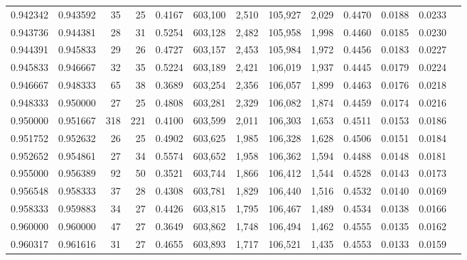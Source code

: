 \begin{tabular}{rrrrrrrrrrrrr}
0.942342 & 0.943592 &     35 &    25 &                                     0.4167 & 603,100 &   2,510 & 105,927 &   2,029 & 0.4470 & 0.0188 & 0.0233 \\
0.943736 & 0.944381 &     28 &    31 &                                     0.5254 & 603,128 &   2,482 & 105,958 &   1,998 & 0.4460 & 0.0185 & 0.0230 \\
0.944391 & 0.945833 &     29 &    26 &                                     0.4727 & 603,157 &   2,453 & 105,984 &   1,972 & 0.4456 & 0.0183 & 0.0227 \\
0.945833 & 0.946667 &     32 &    35 &                                     0.5224 & 603,189 &   2,421 & 106,019 &   1,937 & 0.4445 & 0.0179 & 0.0224 \\
0.946667 & 0.948333 &     65 &    38 &                                     0.3689 & 603,254 &   2,356 & 106,057 &   1,899 & 0.4463 & 0.0176 & 0.0218 \\
0.948333 & 0.950000 &     27 &    25 &                                     0.4808 & 603,281 &   2,329 & 106,082 &   1,874 & 0.4459 & 0.0174 & 0.0216 \\
0.950000 & 0.951667 &    318 &   221 &                                     0.4100 & 603,599 &   2,011 & 106,303 &   1,653 & 0.4511 & 0.0153 & 0.0186 \\
0.951752 & 0.952632 &     26 &    25 &                                     0.4902 & 603,625 &   1,985 & 106,328 &   1,628 & 0.4506 & 0.0151 & 0.0184 \\
0.952652 & 0.954861 &     27 &    34 &                                     0.5574 & 603,652 &   1,958 & 106,362 &   1,594 & 0.4488 & 0.0148 & 0.0181 \\
0.955000 & 0.956389 &     92 &    50 &                                     0.3521 & 603,744 &   1,866 & 106,412 &   1,544 & 0.4528 & 0.0143 & 0.0173 \\
0.956548 & 0.958333 &     37 &    28 &                                     0.4308 & 603,781 &   1,829 & 106,440 &   1,516 & 0.4532 & 0.0140 & 0.0169 \\
0.958333 & 0.959883 &     34 &    27 &                                     0.4426 & 603,815 &   1,795 & 106,467 &   1,489 & 0.4534 & 0.0138 & 0.0166 \\
0.960000 & 0.960000 &     47 &    27 &                                     0.3649 & 603,862 &   1,748 & 106,494 &   1,462 & 0.4555 & 0.0135 & 0.0162 \\
0.960317 & 0.961616 &     31 &    27 &                                     0.4655 & 603,893 &   1,717 & 106,521 &   1,435 & 0.4553 & 0.0133 & 0.0159 \\

\end{tabular}
